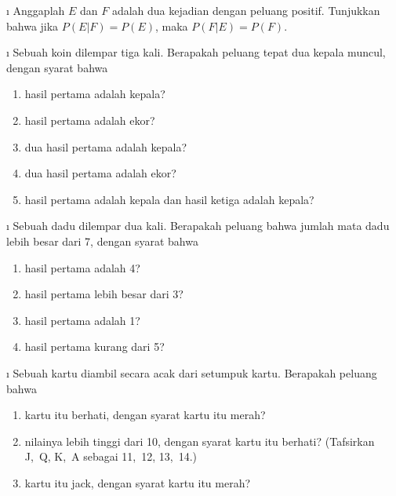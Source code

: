 \exercises
\begin{LJSItem}

\i\label{exer 4.1.1} Anggaplah $E$ dan $F$ adalah dua kejadian dengan peluang
positif.  Tunjukkan bahwa jika $P(E|F) = P(E)$, maka $P(F|E) = P(F)$.

\i\label{exer 4.1.2} Sebuah koin dilempar tiga kali.  Berapakah peluang tepat dua
kepala muncul, dengan syarat bahwa
\begin{enumerate}
\item hasil pertama adalah kepala?

\item hasil pertama adalah ekor?

\item dua hasil pertama adalah kepala?

\item dua hasil pertama adalah ekor?

\item hasil pertama adalah kepala dan hasil ketiga adalah kepala?
\end{enumerate}

\i\label{exer 4.1.3} Sebuah dadu dilempar dua kali.  Berapakah peluang bahwa jumlah mata dadu
lebih besar dari 7, dengan syarat bahwa
\begin{enumerate}
\item hasil pertama adalah 4?

\item hasil pertama lebih besar dari 3?

\item hasil pertama adalah 1?

\item hasil pertama kurang dari 5?
\end{enumerate}

\i\label{exer 4.1.4} Sebuah kartu diambil secara acak dari setumpuk kartu.  Berapakah peluang
bahwa
\begin{enumerate}
\item kartu itu berhati, dengan syarat kartu itu merah?

\item nilainya lebih tinggi dari 10, dengan syarat kartu itu berhati? (Tafsirkan J,~Q, K,~A
sebagai 11,~12, 13,~14.)

\item kartu itu jack, dengan syarat kartu itu merah?
\end{enumerate} 


\end{LJSItem}
